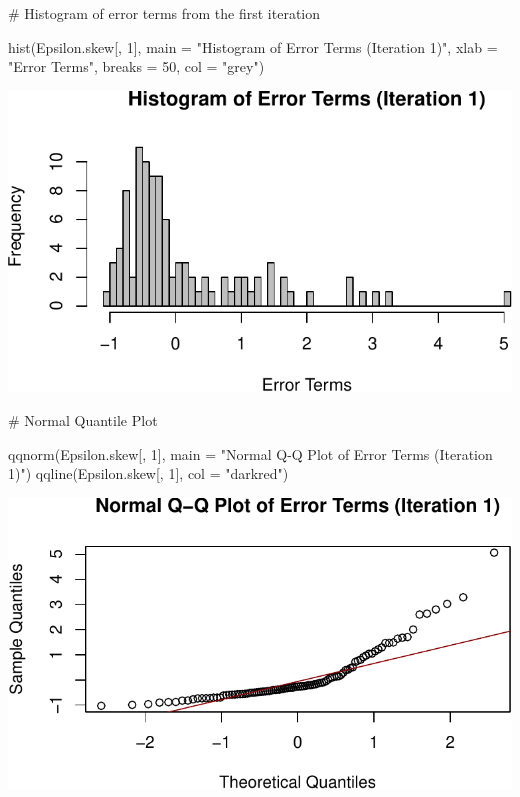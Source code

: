 \documentclass[
  11pt,
]{article}
\newenvironment{Shaded}{\begin{snugshade}}{\end{snugshade}}
\newcommand{\AttributeTok}[1]{\textcolor[rgb]{0.40,0.45,0.13}{#1}}
\newcommand{\CommentTok}[1]{\textcolor[rgb]{0.37,0.37,0.37}{#1}}
\newcommand{\DecValTok}[1]{\textcolor[rgb]{0.68,0.00,0.00}{#1}}
\newcommand{\FunctionTok}[1]{\textcolor[rgb]{0.28,0.35,0.67}{#1}}
\newcommand{\NormalTok}[1]{\textcolor[rgb]{0.00,0.23,0.31}{#1}}
\newcommand{\StringTok}[1]{\textcolor[rgb]{0.13,0.47,0.30}{#1}}
\begin{document}
\begin{Shaded}
\begin{Highlighting}[]
\CommentTok{\# Histogram of error terms from the first iteration}

\FunctionTok{hist}\NormalTok{(Epsilon.skew[, }\DecValTok{1}\NormalTok{], }
     \AttributeTok{main =} \StringTok{"Histogram of Error Terms (Iteration 1)"}\NormalTok{,}
     \AttributeTok{xlab =} \StringTok{"Error Terms"}\NormalTok{, }\AttributeTok{breaks =} \DecValTok{50}\NormalTok{, }\AttributeTok{col =} \StringTok{"grey"}\NormalTok{)}
\end{Highlighting}
\end{Shaded}

\includegraphics{HW-4-CODE-and-ANSWERS_files/figure-pdf/unnamed-chunk-11-1.pdf}

\begin{Shaded}
\begin{Highlighting}[]
\CommentTok{\# Normal Quantile Plot}

\FunctionTok{qqnorm}\NormalTok{(Epsilon.skew[, }\DecValTok{1}\NormalTok{], }
       \AttributeTok{main =} \StringTok{"Normal Q{-}Q Plot of Error Terms (Iteration 1)"}\NormalTok{)}
\FunctionTok{qqline}\NormalTok{(Epsilon.skew[, }\DecValTok{1}\NormalTok{], }\AttributeTok{col =} \StringTok{"darkred"}\NormalTok{)}
\end{Highlighting}
\end{Shaded}

\includegraphics{HW-4-CODE-and-ANSWERS_files/figure-pdf/unnamed-chunk-11-2.pdf}
\end{document}
